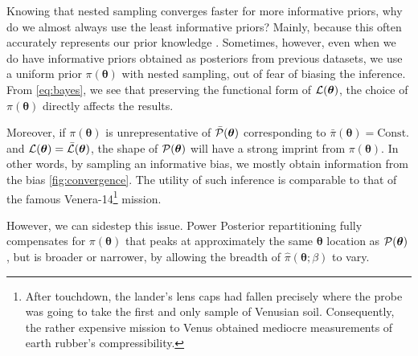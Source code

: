 \documentclass[usenatbib]{mnras}
\begin{document}
Knowing that nested sampling converges faster for more informative
priors, why do we almost always use the least informative priors?
Mainly, because this often accurately represents our prior knowledge
\citep{JeffreysPrior}. Sometimes, however, even when we do have
informative priors obtained as posteriors from previous datasets, we
use a uniform prior \(\pi (\bm{\theta})\) with nested sampling, out of
fear of biasing the inference. From \cref{eq:bayes}, we see that
preserving the functional form of \( {\cal L} (\bm{\theta})\), the
choice of \( \pi (\bm{\theta})\) directly affects the results.

Moreover, if \( \pi (\bm{\theta})\) is unrepresentative of
\( \bar{\cal P}(\bm{\theta})\) corresponding to
\( \bar{\pi} (\bm{\theta}) = \text{Const.}\) and
\( {\cal L} (\bm{\theta}) = \bar{\cal L} (\bm{\theta})\), the shape of
\( {\cal P}(\bm{\theta})\) will have a strong imprint from
\( \pi (\bm{\theta})\). In other words, by sampling an informative
bias, we mostly obtain information from the bias
\cref{fig:convergence}.  The utility of such inference is comparable
to that of the famous Venera-14\footnote{After touchdown, the lander's
  lens caps had fallen precisely where the probe was going to take the
  first and only sample of Venusian soil. Consequently, the rather
  expensive mission to Venus obtained mediocre measurements of earth
  rubber's compressibility.  } mission.

However, we can sidestep this issue. Power Posterior repartitioning
fully compensates for \( \pi (\bm{\theta})\) that peaks at
approximately the same $\bm{\theta}$ location as
\( {\cal P}(\bm{\theta})\), but is broader or narrower, by allowing
the breadth of \( \hat{\pi} (\bm{\theta};\beta)\) to vary.
\end{document}
